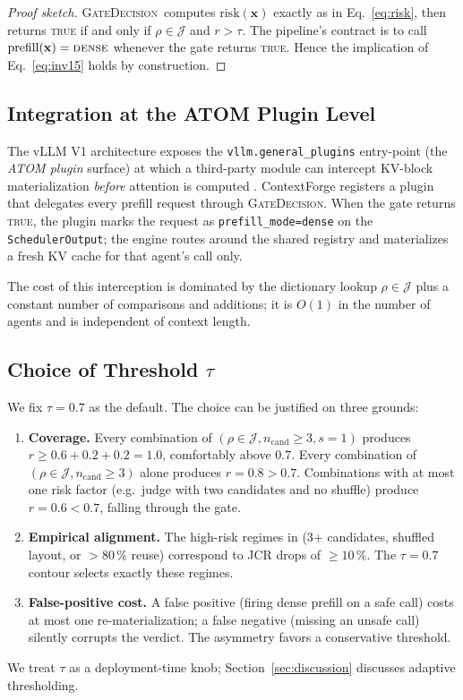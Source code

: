 \documentclass[10pt,twocolumn]{article}
\newcommand{\Risk}{\mathrm{risk}}
\newcommand{\Judge}{\mathcal{J}}
\newcommand{\Cand}{n_{\text{cand}}}
\newcommand{\Shuf}{s}
\newcommand{\GateDecision}{\textsc{GateDecision}}
\begin{document}
\begin{proof}[Proof sketch]
\GateDecision\ computes $\Risk(\mathbf{x})$ exactly as in
Eq.~\ref{eq:risk}, then returns \textsc{true} if and only if
$\rho \in \Judge$ and $r > \tau$. The pipeline's contract is to call
$\mathrm{prefill}(\mathbf{x}) = \textsc{dense}$ whenever the gate returns
\textsc{true}. Hence the implication of Eq.~\ref{eq:inv15} holds by
construction.
\end{proof}

\subsection{Integration at the ATOM Plugin Level}
\label{sec:invariant:atom}

The vLLM V1 architecture exposes the \texttt{vllm.general\_plugins}
entry-point (the \emph{ATOM plugin} surface) at which a third-party module
can intercept KV-block materialization \emph{before} attention is computed
\cite{vllm}. ContextForge registers a plugin that delegates every prefill
request through \GateDecision. When the gate returns \textsc{true}, the
plugin marks the request as \texttt{prefill\_mode=dense} on the
\texttt{SchedulerOutput}; the engine routes around the shared registry and
materializes a fresh KV cache for that agent's call only.

The cost of this interception is dominated by the dictionary lookup
$\rho \in \Judge$ plus a constant number of comparisons and additions; it
is $O(1)$ in the number of agents and is independent of context length.

\subsection{Choice of Threshold $\tau$}
\label{sec:invariant:threshold}

We fix $\tau = 0.7$ as the default. The choice can be justified on three
grounds:
\begin{enumerate}
  \item \textbf{Coverage.} Every combination of $(\rho \in \Judge,
        \Cand \geq 3, \Shuf = 1)$ produces $r \geq 0.6 + 0.2 + 0.2 = 1.0$,
        comfortably above $0.7$. Every combination of
        $(\rho \in \Judge, \Cand \geq 3)$ alone produces $r = 0.8 > 0.7$.
        Combinations with at most one risk factor (e.g.\ judge with two
        candidates and no shuffle) produce $r = 0.6 < 0.7$, falling
        through the gate.
  \item \textbf{Empirical alignment.} The high-risk regimes in
        \cite{jcrfailure} (3+ candidates, shuffled layout, or
        $>80\,\%$ reuse) correspond to JCR drops of $\geq 10\,\%$. The
        $\tau = 0.7$ contour selects exactly these regimes.
  \item \textbf{False-positive cost.} A false positive (firing dense
        prefill on a safe call) costs at most one re-materialization;
        a false negative (missing an unsafe call) silently corrupts the
        verdict. The asymmetry favors a conservative threshold.
\end{enumerate}
We treat $\tau$ as a deployment-time knob; Section~\ref{sec:discussion}
discusses adaptive thresholding.
\end{document}
